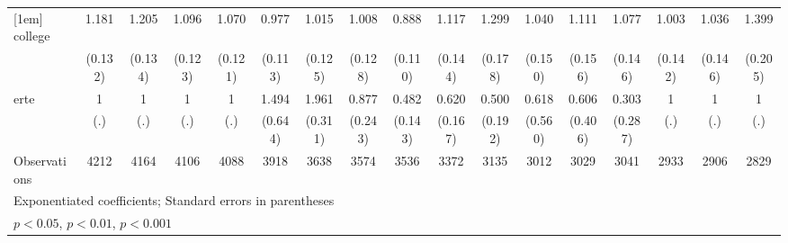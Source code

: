 {\begin{tabular}{l*{16}{c}}
[1em]
college             &       1.181         &       1.205         &       1.096         &       1.070         &       0.977         &       1.015         &       1.008         &       0.888         &       1.117         &       1.299         &       1.040         &       1.111         &       1.077         &       1.003         &       1.036         &       1.399\sym{*}  \\
                    &     (0.132)         &     (0.134)         &     (0.123)         &     (0.121)         &     (0.113)         &     (0.125)         &     (0.128)         &     (0.110)         &     (0.144)         &     (0.178)         &     (0.150)         &     (0.156)         &     (0.146)         &     (0.142)         &     (0.146)         &     (0.205)         \\
[1em]
erte                &           1         &           1         &           1         &           1         &       1.494         &       1.961\sym{***}&       0.877         &       0.482\sym{*}  &       0.620         &       0.500         &       0.618         &       0.606         &       0.303         &           1         &           1         &           1         \\
                    &         (.)         &         (.)         &         (.)         &         (.)         &     (0.644)         &     (0.311)         &     (0.243)         &     (0.143)         &     (0.167)         &     (0.192)         &     (0.560)         &     (0.406)         &     (0.287)         &         (.)         &         (.)         &         (.)         \\
\hline
Observations        &        4212         &        4164         &        4106         &        4088         &        3918         &        3638         &        3574         &        3536         &        3372         &        3135         &        3012         &        3029         &        3041         &        2933         &        2906         &        2829         \\
\hline\hline
\multicolumn{17}{l}{\footnotesize Exponentiated coefficients; Standard errors in parentheses}\\
\multicolumn{17}{l}{\footnotesize \sym{*} \(p<0.05\), \sym{**} \(p<0.01\), \sym{***} \(p<0.001\)}\\
\end{tabular}
}
